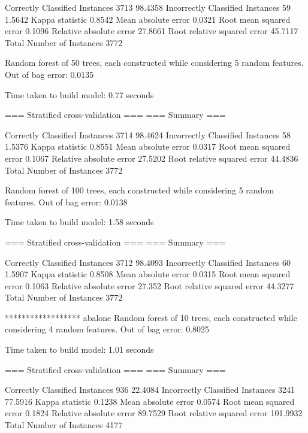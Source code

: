 Correctly Classified Instances        3713               98.4358 %
Incorrectly Classified Instances        59                1.5642 %
Kappa statistic                          0.8542
Mean absolute error                      0.0321
Root mean squared error                  0.1096
Relative absolute error                 27.8661 %
Root relative squared error             45.7117 %
Total Number of Instances             3772     



Random forest of 50 trees, each constructed while considering 5 random features.
Out of bag error: 0.0135



Time taken to build model: 0.77 seconds

=== Stratified cross-validation ===
=== Summary ===

Correctly Classified Instances        3714               98.4624 %
Incorrectly Classified Instances        58                1.5376 %
Kappa statistic                          0.8551
Mean absolute error                      0.0317
Root mean squared error                  0.1067
Relative absolute error                 27.5202 %
Root relative squared error             44.4836 %
Total Number of Instances             3772



Random forest of 100 trees, each constructed while considering 5 random features.
Out of bag error: 0.0138



Time taken to build model: 1.58 seconds

=== Stratified cross-validation ===
=== Summary ===

Correctly Classified Instances        3712               98.4093 %
Incorrectly Classified Instances        60                1.5907 %
Kappa statistic                          0.8508
Mean absolute error                      0.0315
Root mean squared error                  0.1063
Relative absolute error                 27.352  %
Root relative squared error             44.3277 %
Total Number of Instances             3772     


****************** abalone
Random forest of 10 trees, each constructed while considering 4 random features.
Out of bag error: 0.8025



Time taken to build model: 1.01 seconds

=== Stratified cross-validation ===
=== Summary ===

Correctly Classified Instances         936               22.4084 %
Incorrectly Classified Instances      3241               77.5916 %
Kappa statistic                          0.1238
Mean absolute error                      0.0574
Root mean squared error                  0.1824
Relative absolute error                 89.7529 %
Root relative squared error            101.9932 %
Total Number of Instances             4177



